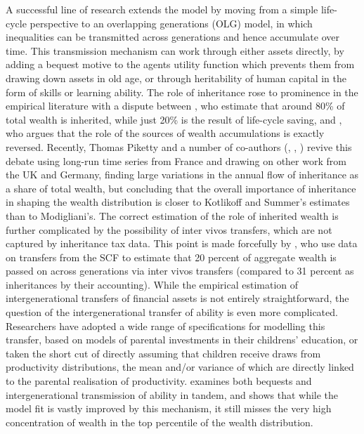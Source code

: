 A successful line of research extends the model by moving from a simple life-
cycle perspective to an overlapping generations (OLG) model, in which inequalities
can be transmitted across generations and hence accumulate over time. This 
transmission mechanism can work through either assets directly, by adding 
a bequest motive to the agents utility function which prevents them from drawing
down assets in old age, or through heritability of human capital in the form 
of skills or learning ability. The role of inheritance rose to prominence in the 
empirical literature with a dispute between \citet{KotlikoffSummers1981}, who 
estimate that around 80\% of total wealth is inherited, while just 20\% is 
the result of life-cycle saving, and \citet{Modigliani1986}, who argues that the 
role of the sources of wealth accumulations is exactly reversed. Recently, Thomas
Piketty and a number of co-authors (\citealt{Piketty2011}, 
\citealt{PikettyPostelRosenthal2014}, \citealt{PikettyZucman2015}) revive this
debate using long-run time series from France and drawing on other work from 
the UK and Germany, finding large variations in the annual flow of inheritance
as a share of total wealth, but concluding that the overall importance of inheritance
in shaping the wealth distribution is closer to Kotlikoff and Summer's estimates
than to Modigliani's. The correct estimation of the role of inherited wealth is
further complicated by the possibility of inter vivos transfers, which are not
captured by inheritance tax data. This point is made forcefully by 
\citet{GaleScholz1994}, who use data on transfers from the SCF to estimate that
20 percent of aggregate wealth is passed on across generations via inter vivos
transfers (compared to 31 percent as inheritances by their accounting). While
the empirical estimation of intergenerational transfers of financial assets is
not entirely straightforward, the question of the intergenerational transfer 
of ability is even more complicated. Researchers have adopted a wide range of 
specifications for modelling this transfer, based on models of parental 
investments in their childrens' education, or taken the short cut of directly 
assuming that children receive draws from productivity distributions, the 
mean and/or variance of which are directly linked to the parental realisation 
of productivity. \citet{DeNardi2004} examines both bequests and intergenerational
transmission of ability in tandem, and shows that while the model fit is vastly
improved by this mechanism, it still misses the very high concentration of 
wealth in the top percentile of the wealth distribution.


